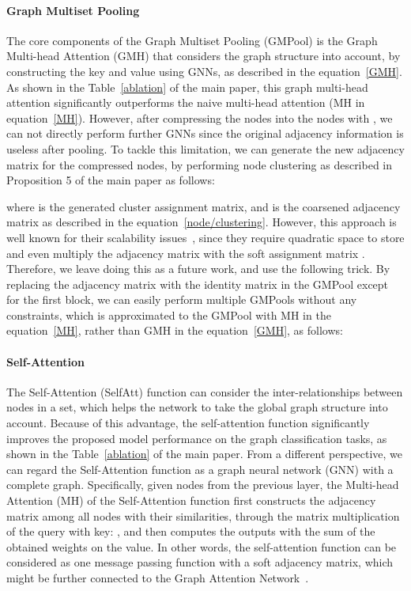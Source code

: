 \documentclass{article} \usepackage{iclr2021_conference,times}
\begin{document}
\paragraph{Graph Multiset Pooling} The core components of the Graph Multiset Pooling (GMPool) is the Graph Multi-head Attention (GMH) that considers the graph structure into account, by constructing the key  and value  using GNNs, as described in the equation~\ref{GMH}. As shown in the Table~\ref{ablation} of the main paper, this graph multi-head attention significantly outperforms the naive multi-head attention (MH in equation~\ref{MH}). However, after compressing the  nodes into the  nodes with , we can not directly perform further GNNs since the original adjacency information is useless after pooling. To tackle this limitation, we can generate the new adjacency matrix  for the compressed nodes, by performing node clustering as described in Proposition 5 of the main paper as follows:

where  is the generated cluster assignment matrix, and  is the coarsened adjacency matrix as described in the equation~\ref{node/clustering}. However, this approach is well known for their scalability issues~\citep{SAGPool, GNN/sparse/pooling:Readout}, since they require quadratic space  to store and even multiply the adjacency matrix  with the soft assignment matrix . Therefore, we leave doing this as a future work, and use the following trick. By replacing the adjacency matrix  with the identity matrix  in the GMPool except for the first block, we can easily perform multiple GMPools without any constraints, which is approximated to the GMPool with MH in the equation~\ref{MH}, rather than GMH in the equation~\ref{GMH}, as follows:


\paragraph{Self-Attention}
The Self-Attention (SelfAtt) function can consider the inter-relationships between nodes in a set, which helps the network to take the global graph structure into account. Because of this advantage, the self-attention function significantly improves the proposed model performance on the graph classification tasks, as shown in the Table~\ref{ablation} of the main paper. From a different perspective, we can regard the Self-Attention function as a graph neural network (GNN) with a complete graph. Specifically, given  nodes from the previous layer, the Multi-head Attention (MH) of the Self-Attention function first constructs the adjacency matrix among all nodes with their similarities, through the matrix multiplication of the query with key: , and then computes the outputs with the sum of the obtained weights on the value. In other words, the self-attention function can be considered as one message passing function with a soft adjacency matrix, which might be further connected to the Graph Attention Network~\citep{GAT}.
\end{document}
